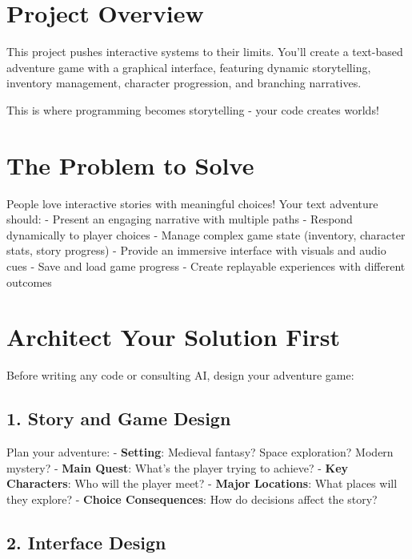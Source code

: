 \documentclass[
  letterpaper,
  DIV=11,
  numbers=noendperiod,
  oneside]{scrreprt}
\begin{document}
\section{Project Overview}\label{project-overview-10}

This project pushes interactive systems to their limits. You'll create a
text-based adventure game with a graphical interface, featuring dynamic
storytelling, inventory management, character progression, and branching
narratives.

This is where programming becomes storytelling - your code creates
worlds!

\section{The Problem to Solve}\label{the-problem-to-solve-10}

People love interactive stories with meaningful choices! Your text
adventure should: - Present an engaging narrative with multiple paths -
Respond dynamically to player choices - Manage complex game state
(inventory, character stats, story progress) - Provide an immersive
interface with visuals and audio cues - Save and load game progress -
Create replayable experiences with different outcomes

\section{Architect Your Solution
First}\label{architect-your-solution-first-10}

Before writing any code or consulting AI, design your adventure game:

\subsection{1. Story and Game Design}\label{story-and-game-design}

Plan your adventure: - \textbf{Setting}: Medieval fantasy? Space
exploration? Modern mystery? - \textbf{Main Quest}: What's the player
trying to achieve? - \textbf{Key Characters}: Who will the player meet?
- \textbf{Major Locations}: What places will they explore? -
\textbf{Choice Consequences}: How do decisions affect the story?

\subsection{2. Interface Design}\label{interface-design}
\end{document}
